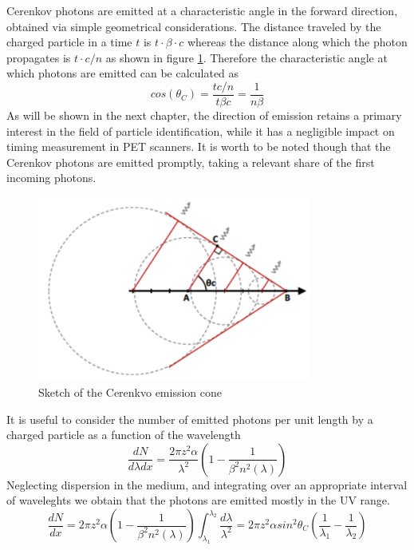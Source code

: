 Cerenkov photons are emitted at a characteristic angle in the forward direction, obtained via simple geometrical considerations. The distance traveled by the charged particle in a time $t$ is $t\cdot \beta \cdot c$ whereas the distance along which the photon propagates is $t\cdot c /n$ as shown in figure \ref{fig:cone}.
Therefore the characteristic angle at which photons are emitted can be calculated as
\begin{equation}
cos(\theta _{C}) = \frac{t c/n}{t \beta c} = \frac{1}{n\beta}
\end{equation}
As will be shown in the next chapter, the direction of emission retains a primary interest in the field of particle identification, while it has a negligible impact on timing measurement in PET scanners. It is worth to be noted though that the Cerenkov photons are emitted promptly, taking a relevant share of the first incoming photons.  
\begin{figure}
\centering
\includegraphics[width=9cm]{../Pictures/Chapter_2/cone.pdf}
\caption[Cerenkov emission cone]{Sketch of the Cerenkvo emission cone}
\label{fig:cone}
\end{figure}
It is useful to consider the number of emitted photons per unit length by a charged particle as a function of the wavelength
\begin{equation}
\frac{dN}{d\lambda dx} = \frac{2\pi z^{2}\alpha}{\lambda ^{2}}\left( 1 - \frac{1}{\beta ^{2}n^{2}(\lambda)} \right)
\end{equation}
Neglecting dispersion in the medium, and integrating over an appropriate interval of waveleghts we obtain that the photons are emitted mostly in the UV range.
\begin{equation}
\frac{dN}{dx} = 2\pi z^{2} \alpha \left( 1-\frac{1}{\beta ^{2} n^{2} (\lambda)}\right) \int _{\lambda _{1}} ^{\lambda _{2}} \frac{d\lambda}{\lambda ^{2}}  = 2\pi z^{2}\alpha sin^{2}\theta _{C} \left( \frac{1}{\lambda _{1}}-\frac{1}{\lambda _{2}}\right)
\label{eq:number}
\end{equation}

